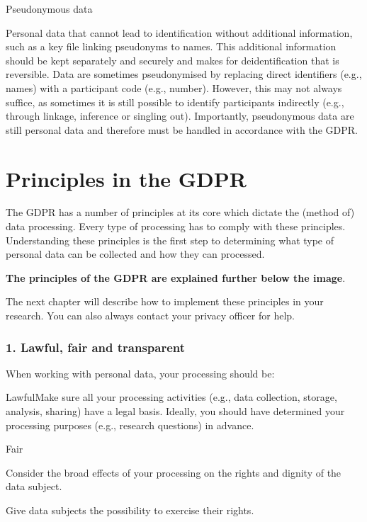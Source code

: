 \documentclass[
]{book}
\begin{document}
Pseudonymous data

Personal data that cannot lead to identification without additional information, such as a key file linking pseudonyms to names. This additional information should be kept separately and securely and makes for deidentification that is reversible. Data are sometimes pseudonymised by replacing direct identifiers (e.g., names) with a participant code (e.g., number). However, this may not always suffice, as sometimes it is still possible to identify participants indirectly (e.g., through linkage, inference or singling out). Importantly, pseudonymous data are still personal data and therefore must be handled in accordance with the GDPR.

\hypertarget{gdpr-principles}{%
\section*{Principles in the GDPR}\label{gdpr-principles}}

The GDPR has a number of principles at its core which dictate the (method of) data processing. Every type of processing has to comply with these principles. Understanding these principles is the first step to determining what type of personal data can be collected and how they can processed.

\textbf{The principles of the GDPR are explained further below the image}.

The next chapter will describe how to implement these principles in your research. You can also always contact your privacy officer for help.

\hypertarget{lawful-fair-and-transparent}{%
\subsubsection{1. Lawful, fair and transparent}\label{lawful-fair-and-transparent}}

When working with personal data, your processing should be:

LawfulMake sure all your processing activities (e.g., data collection, storage, analysis, sharing) have a legal basis. Ideally, you should have determined your processing purposes (e.g., research questions) in advance.

Fair

Consider the broad effects of your processing on the rights and dignity of the data subject.

Give data subjects the possibility to exercise their rights.
\end{document}
